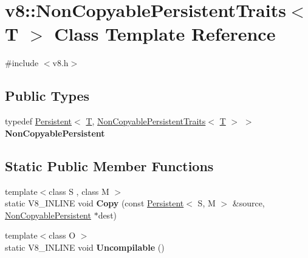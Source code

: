 \hypertarget{classv8_1_1NonCopyablePersistentTraits}{}\section{v8\+:\+:Non\+Copyable\+Persistent\+Traits$<$ T $>$ Class Template Reference}
\label{classv8_1_1NonCopyablePersistentTraits}


{\ttfamily \#include $<$v8.\+h$>$}

\subsection*{Public Types}
\begin{DoxyCompactItemize}
\item 
\mbox{\label{classv8_1_1NonCopyablePersistentTraits_af26082b31726b82c0482a01daa2f3e54}} 
typedef \mbox{\hyperlink{classv8_1_1Persistent}{Persistent}}$<$ \mbox{\hyperlink{classv8_1_1internal_1_1torque_1_1T}{T}}, \mbox{\hyperlink{classv8_1_1NonCopyablePersistentTraits}{Non\+Copyable\+Persistent\+Traits}}$<$ \mbox{\hyperlink{classv8_1_1internal_1_1torque_1_1T}{T}} $>$ $>$ {\bfseries Non\+Copyable\+Persistent}
\end{DoxyCompactItemize}
\subsection*{Static Public Member Functions}
\begin{DoxyCompactItemize}
\item 
\mbox{\label{classv8_1_1NonCopyablePersistentTraits_a40b133b17a334c5c7674135e7dbcf850}} 
{\footnotesize template$<$class S , class M $>$ }\\static V8\+\_\+\+I\+N\+L\+I\+NE void {\bfseries Copy} (const \mbox{\hyperlink{classv8_1_1Persistent}{Persistent}}$<$ S, M $>$ \&source, \mbox{\hyperlink{classv8_1_1Persistent}{Non\+Copyable\+Persistent}} $\ast$dest)
\item 
\mbox{\label{classv8_1_1NonCopyablePersistentTraits_a90e2c6958ba089f5fabbbc7c08f976c1}} 
{\footnotesize template$<$class O $>$ }\\static V8\+\_\+\+I\+N\+L\+I\+NE void {\bfseries Uncompilable} ()
\end{DoxyCompactItemize}
